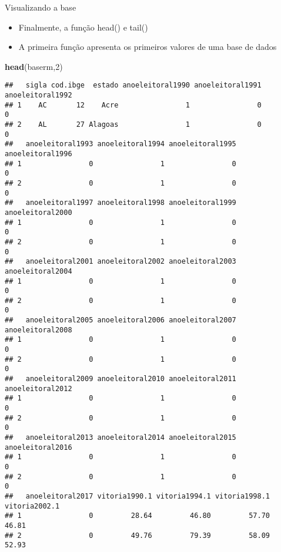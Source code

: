 \documentclass[
  10pt,
  ignorenonframetext,
]{beamer}
\newenvironment{Shaded}{\begin{snugshade}}{\end{snugshade}}
\newcommand{\DecValTok}[1]{\textcolor[rgb]{0.00,0.00,0.81}{#1}}
\newcommand{\KeywordTok}[1]{\textcolor[rgb]{0.13,0.29,0.53}{\textbf{#1}}}
\newcommand{\NormalTok}[1]{#1}
\providecommand{\tightlist}{%
  \setlength{\itemsep}{0pt}\setlength{\parskip}{0pt}}
\begin{document}
\begin{frame}[fragile]{Visualizando a base}
\protect\hypertarget{visualizando-a-base-5}{}
\begin{itemize}
\tightlist
\item
  Finalmente, a função head() e tail()
\item
  A primeira função apresenta os primeiros valores de uma base de dados
\end{itemize}

\begin{Shaded}
\begin{Highlighting}[]
\KeywordTok{head}\NormalTok{(baserm,}\DecValTok{2}\NormalTok{)}
\end{Highlighting}
\end{Shaded}

\begin{verbatim}
##   sigla cod.ibge  estado anoeleitoral1990 anoeleitoral1991 anoeleitoral1992
## 1    AC       12    Acre                1                0                0
## 2    AL       27 Alagoas                1                0                0
##   anoeleitoral1993 anoeleitoral1994 anoeleitoral1995 anoeleitoral1996
## 1                0                1                0                0
## 2                0                1                0                0
##   anoeleitoral1997 anoeleitoral1998 anoeleitoral1999 anoeleitoral2000
## 1                0                1                0                0
## 2                0                1                0                0
##   anoeleitoral2001 anoeleitoral2002 anoeleitoral2003 anoeleitoral2004
## 1                0                1                0                0
## 2                0                1                0                0
##   anoeleitoral2005 anoeleitoral2006 anoeleitoral2007 anoeleitoral2008
## 1                0                1                0                0
## 2                0                1                0                0
##   anoeleitoral2009 anoeleitoral2010 anoeleitoral2011 anoeleitoral2012
## 1                0                1                0                0
## 2                0                1                0                0
##   anoeleitoral2013 anoeleitoral2014 anoeleitoral2015 anoeleitoral2016
## 1                0                1                0                0
## 2                0                1                0                0
##   anoeleitoral2017 vitoria1990.1 vitoria1994.1 vitoria1998.1 vitoria2002.1
## 1                0         28.64         46.80         57.70         46.81
## 2                0         49.76         79.39         58.09         52.93

\end{verbatim}
\end{frame}
\end{document}
